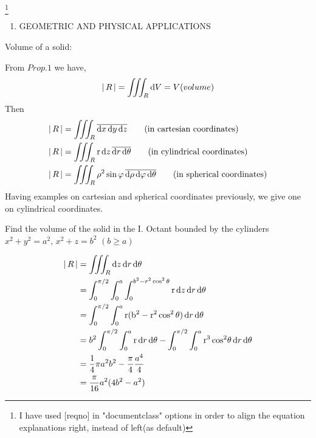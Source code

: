 \documentclass[reqno]{amsbook}
\begin{document}
    \footnote{I have used [reqno] in "documentclass" options in order to align the equation explanations right, instead of left(as default)}
    \begin{enumerate}[label= D.]
        \item GEOMETRIC AND PHYSICAL APPLICATIONS
    \end{enumerate}
    \begin{hEnumerateArabic}
        \item Volume of a solid:\\
    \end{hEnumerateArabic}
    From $Prop. 1$ we have,
    \begin{equation*}
        \left \lvert \, R \, \right \rvert = \iiint_R \mathrm{d}V = V (volume)
    \end{equation*}
    Then
    \begin{align*}
        \left \lvert \, R \, \right \rvert &= \iiint_R \overline{\mathrm{d}x \,\mathrm{d}y \,\mathrm{d}z} \tag{in cartesian coordinates} \\
        \left \lvert \, R \, \right \rvert &= \iiint_R \mathrm{r} \, \mathrm{d}z \, \overline{\mathrm{d}r \,\mathrm{d}\theta} \tag{in cylindrical coordinates} \\
        \left \lvert \, R \, \right \rvert &= \iiint_R \mathrm{\rho^2} \, \mathrm{\sin \varphi} \, \overline{\mathrm{d}\rho \,\mathrm{d}\varphi \,\mathrm{d}\theta} \tag{in spherical coordinates}
    \end{align*}
    Having examples on cartesian and spherical coordinates previously, we give one on cylindrical coordinates.
    \begin{exmp}
        Find the volume of the solid in the I. Octant bounded by the cylinders $x^2 + y^2 = a^2$, $x^2 + z = b^2$ $(b \geq a)$
    \end{exmp}
    \begin{hSolution}
        \begin{equation*}
            \begin{split}
                \left \lvert \, R \, \right \rvert & = \iiint_R \mathrm{d}z \, \mathrm{d}r \,\mathrm{d}\theta \\
                & = \int_0^{\pi/2} \int_0^a \int_0^{b^2-r^2\cos^2\theta} \mathrm{r} \, \mathrm{d}z \, \mathrm{d}r \,\mathrm{d}\theta \\
                & = \int_0^{\pi/2} \int_0^a \mathrm{r(b^2-r^2\cos^2\theta)} \, \mathrm{d}r \,\mathrm{d}\theta \\
                & = b^2\int_0^{\pi/2} \int_0^a \mathrm{r} \, \mathrm{d}r \,\mathrm{d}\theta - \int_0^{\pi/2} \int_0^a \mathrm{r^3} \, \mathrm{cos^2\theta} \, \mathrm{d}r \,\mathrm{d}\theta \\
                & = \frac{1}{4}\pi a^2 b^2 - \frac{\pi}{4}\frac{a^4}{4} \\
                & = \frac{\pi}{16} a^2 (4b^2 - a^2)
            \end{split}
        \end{equation*}
    \end{hSolution}
\end{document}
